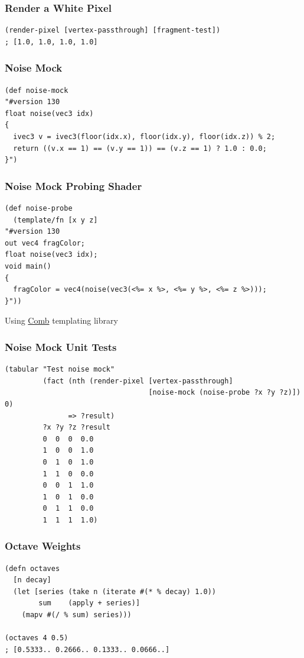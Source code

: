 \documentclass[aspectratio=169,11pt,xcolor=dvipsnames]{beamer}
\begin{document}
\begin{frame}[fragile]
  \frametitle{Render a White Pixel}
  \begin{verbatim}
(render-pixel [vertex-passthrough] [fragment-test])
; [1.0, 1.0, 1.0, 1.0]
  \end{verbatim}
\end{frame}

\begin{frame}[fragile]
  \frametitle{Noise Mock}
  \begin{verbatim}
(def noise-mock
"#version 130
float noise(vec3 idx)
{
  ivec3 v = ivec3(floor(idx.x), floor(idx.y), floor(idx.z)) % 2;
  return ((v.x == 1) == (v.y == 1)) == (v.z == 1) ? 1.0 : 0.0;
}")
  \end{verbatim}
\end{frame}

\begin{frame}[fragile]
  \frametitle{Noise Mock Probing Shader}
  \begin{verbatim}
(def noise-probe
  (template/fn [x y z]
"#version 130
out vec4 fragColor;
float noise(vec3 idx);
void main()
{
  fragColor = vec4(noise(vec3(<%= x %>, <%= y %>, <%= z %>)));
}"))
  \end{verbatim}
  \bigskip
  Using \href{https://github.com/weavejester/comb}{Comb} templating library
\end{frame}

\begin{frame}[fragile]
  \frametitle{Noise Mock Unit Tests}
  \begin{verbatim}
(tabular "Test noise mock"
         (fact (nth (render-pixel [vertex-passthrough]
                                  [noise-mock (noise-probe ?x ?y ?z)]) 0)
               => ?result)
         ?x ?y ?z ?result
         0  0  0  0.0
         1  0  0  1.0
         0  1  0  1.0
         1  1  0  0.0
         0  0  1  1.0
         1  0  1  0.0
         0  1  1  0.0
         1  1  1  1.0)
  \end{verbatim}
\end{frame}

\begin{frame}[fragile]
  \frametitle{Octave Weights}
  \begin{verbatim}
(defn octaves
  [n decay]
  (let [series (take n (iterate #(* % decay) 1.0))
        sum    (apply + series)]
    (mapv #(/ % sum) series)))

(octaves 4 0.5)
; [0.5333.. 0.2666.. 0.1333.. 0.0666..]
  \end{verbatim}
\end{frame}
\end{document}

